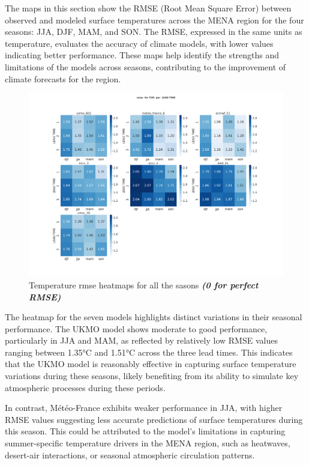 The maps in this section show the RMSE (Root Mean Square Error) between observed and modeled surface temperatures across the MENA region for the four seasons: JJA, DJF, MAM, and SON. The RMSE, expressed in the same units as temperature, evaluates the accuracy of climate models, with lower values indicating better performance.  These maps help identify the strengths and limitations of the models across seasons, contributing to the improvement of climate forecasts for the region.
\begin{figure}[H]
    \centering
    \includegraphics[width=1\linewidth]{plots/det/rmse/rmse_T2M.png}
    \caption{Temperature rmse heatmaps for all the sasons \textbf{\textit{(0 for perfect RMSE)} }}
\end{figure}

The heatmap for the seven models highlights distinct variations in their seasonal performance. The UKMO model shows moderate to good performance, particularly in JJA and MAM, as reflected by relatively low RMSE values ranging between 1.35°C and 1.51°C across the three lead times. This indicates that the UKMO model is reasonably effective in capturing surface temperature variations during these seasons, likely benefiting from its ability to simulate key atmospheric processes during these periods.

In contrast, Météo-France exhibits weaker performance in JJA, with higher RMSE values suggesting less accurate predictions of surface temperatures during this season. This could be attributed to the model's limitations in capturing summer-specific temperature drivers in the MENA region, such as heatwaves, desert-air interactions, or seasonal atmospheric circulation patterns.

